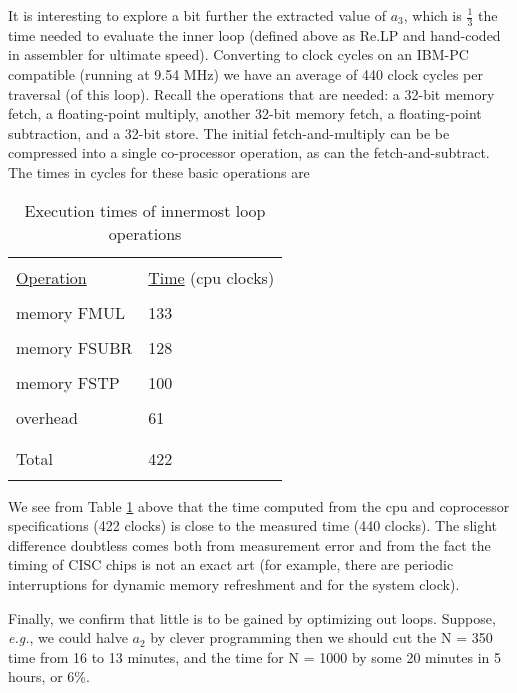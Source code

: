 It is interesting to explore a bit further the extracted value of $a_3$,
which is $\frac{1}{3}$ the time needed to evaluate the inner loop (defined
above as Re.LP and hand-coded in assembler for ultimate
speed). Converting to clock cycles on an IBM-PC compatible
(running at 9.54 MHz) we have an average of 440 clock cycles per
traversal (of this loop). Recall the operations that are needed: a
32-bit memory fetch, a floating-point multiply, another 32-bit
memory fetch, a floating-point subtraction, and a 32-bit store.
The initial fetch-and-multiply can be be compressed into a single
co-processor operation, as can the fetch-and-subtract. The times
in cycles for these basic operations are
\begin{table}
    \centering
    \caption{Execution times of innermost loop operations}
        \bigskip
    \label{tbl:09_02} 
    \setlength{\tabcolsep}{10pt}
        \begin{tabular}{|ll|}
            \hline &  \\
            \underline{Operation} & \underline{Time} \; (cpu clocks)\\
            &  \\
            memory FMUL &  133  \\
            &  \\
            memory FSUBR &  128  \\
            &  \\
            memory FSTP &  100  \\ 
            &  \\
            overhead &  61  \\ 
            &  \\
            \hline &  \\
            Total &  422  \\ 
            &  \\
            \hline
        \end{tabular}
\end{table}
 
We see from Table \ref{tbl:09_02} above that the time computed from the cpu and coprocessor specifications (422 clocks) is close to the measured time (440 clocks). The slight difference doubtless comes both from measurement error and from the fact the timing of CISC chips is not an exact art (for example, there are periodic interruptions for dynamic memory refreshment and for the system clock).

Finally, we confirm that little is to be gained by optimizing out loops. Suppose, \textit{e.g.}, we could halve $a_2$ by clever programming then we should cut the N = 350 time from 16 to 13 minutes, and the time for N = 1000 by some 20 minutes in 5 hours, or 6\%.

